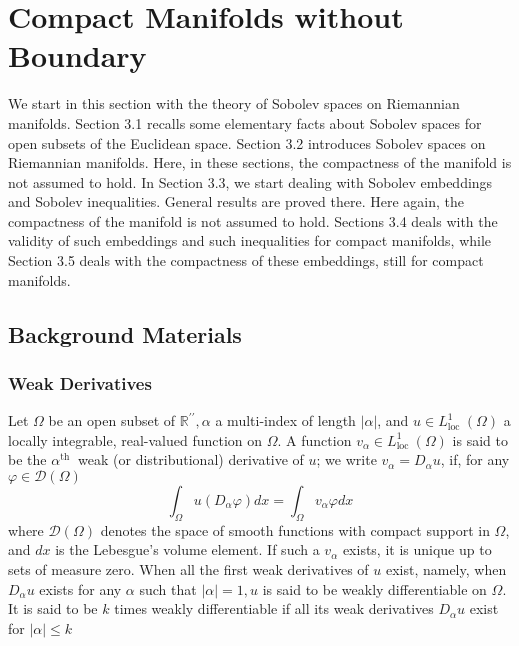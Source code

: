 \documentclass[12pt,hyperref,a4paper,UTF8]{ctexart}
\begin{document}
\newpage



\section{Compact Manifolds without Boundary}
We start in this section with the theory of Sobolev spaces on Riemannian manifolds. Section 3.1 recalls some elementary facts about Sobolev spaces for open subsets of the Euclidean space. 
Section 3.2 introduces Sobolev spaces on Riemannian manifolds. Here, in these sections, the compactness of the manifold is not assumed to hold. In Section 3.3, we start dealing with Sobolev embeddings and Sobolev inequalities. General results are proved there. Here again, the compactness of the manifold is not assumed to hold. 
Sections 3.4 deals with the validity of such embeddings and such inequalities for compact manifolds, while Section 3.5 deals with the compactness of these embeddings, still for compact manifolds. 

\subsection{Background Materials}

\subsubsection{Weak Derivatives}
Let $\Omega$ be an open subset of $\mathbb{R}^{\prime \prime}, \alpha$ a multi-index of length $|\alpha|$, and $u \in L_{\text {loc }}^1(\Omega)$ a locally integrable, real-valued function on $\Omega$. A function $v_\alpha \in L_{\text {loc }}^{1}(\Omega)$ is said to be the $\alpha^{\text {th }}$ weak (or distributional) derivative of $u$; we write $v_\alpha=D_\alpha u$, if, for any $\varphi \in \mathcal{D}(\Omega)$
$$
\int_{\Omega} u\left(D_\alpha \varphi\right) d x=\int_{\Omega} v_\alpha \varphi d x
$$
where $\mathcal{D}(\Omega)$ denotes the space of smooth functions with compact support in $\Omega$, and $d x$ is the Lebesgue's volume element. If such a $v_\alpha$ exists, it is unique up to sets of measure zero. When all the first weak derivatives of $u$ exist, namely, when $D_\alpha u$ exists for any $\alpha$ such that $|\alpha|=1, u$ is said to be weakly differentiable on $\Omega$. It is said to be $k$ times weakly differentiable if all its weak derivatives $D_\alpha u$ exist for $|\alpha| \leq k$
\end{document}
